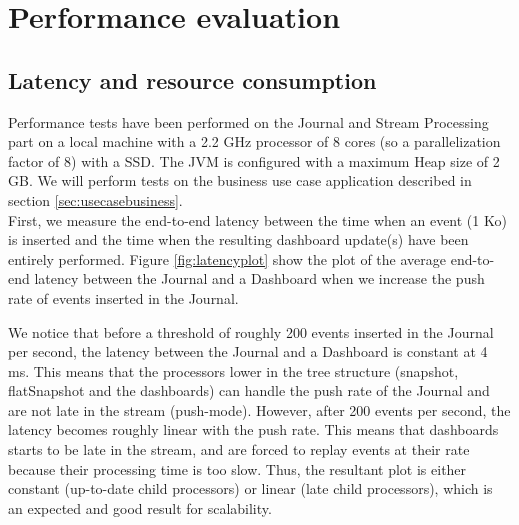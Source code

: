 \section{Performance evaluation}

\subsection{Latency and resource consumption}

Performance tests have been performed on the Journal and Stream Processing part on a local machine with a 2.2 GHz processor of 8 cores (so a parallelization factor of 8) with a SSD. The JVM is configured with a maximum Heap size of 2 GB. We will perform tests on the business use case application described in section \ref{sec:usecasebusiness}.
\\

First, we measure the end-to-end latency between the time when an event (1 Ko) is inserted and the time when the resulting dashboard update(s) have been entirely performed. Figure \ref{fig:latencyplot} show the plot of the average end-to-end latency between the Journal and a Dashboard when we increase the push rate of events inserted in the Journal.

We notice that before a threshold of roughly 200 events inserted in the Journal per second, the latency between the Journal and a Dashboard is constant at 4 ms. This means that the processors lower in the tree structure (snapshot, flatSnapshot and the dashboards) can handle the push rate of the Journal and are not late in the stream (push-mode).
However, after 200 events per second, the latency becomes roughly linear with the push rate. This means that dashboards starts to be late in the stream, and are forced to replay events at their rate because their processing time is too slow. Thus, the resultant plot is either constant (up-to-date child processors) or linear (late child processors), which is an expected and good result for scalability.
\\

